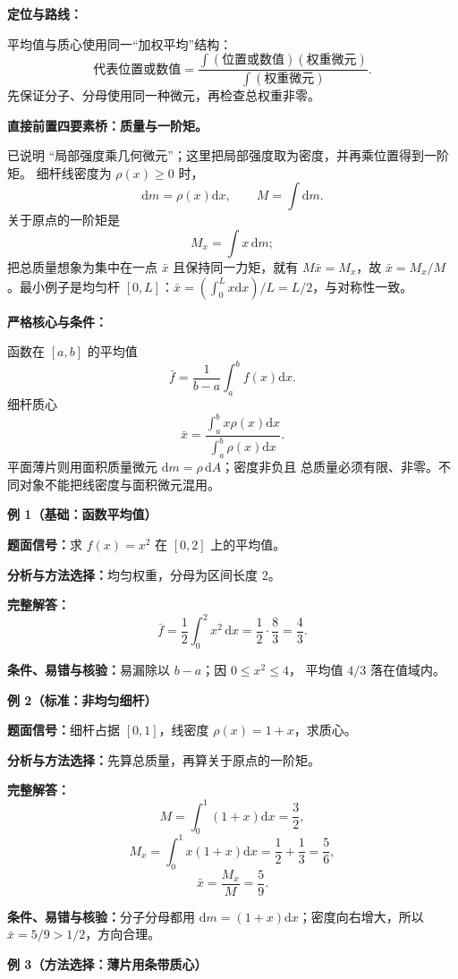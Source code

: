 \begin{knowledgeBox}
\textbf{定位与路线：}

平均值与质心使用同一“加权平均”结构：
\[
\boxed{\text{代表位置或数值}
=\frac{\int(\text{位置或数值})(\text{权重微元})}
{\int(\text{权重微元})}.}
\]
先保证分子、分母使用同一种微元，再检查总权重非零。

\textbf{直接前置四要素桥：质量与一阶矩。}

已说明
“局部强度乘几何微元”；这里把局部强度取为密度，并再乘位置得到一阶矩。
细杆线密度为 \(\rho(x)\ge0\) 时，
\[
\mathrm dm=\rho(x)\mathrm dx,\qquad
M=\int\mathrm dm.
\]
关于原点的一阶矩是
\[
M_x=\int x\,\mathrm dm;
\]
把总质量想象为集中在一点 \(\bar x\) 且保持同一力矩，就有
\(M\bar x=M_x\)，故 \(\bar x=M_x/M\)。最小例子是均匀杆
\([0,L]\)：\(\bar x=(\int_0^Lx\mathrm dx)/L=L/2\)，与对称性一致。

\textbf{严格核心与条件：}

函数在 \([a,b]\) 的平均值
\[
\bar f=\frac1{b-a}\int_a^bf(x)\mathrm dx.
\]
细杆质心
\[
\bar x=\frac{\int_a^bx\rho(x)\mathrm dx}
{\int_a^b\rho(x)\mathrm dx}.
\]
平面薄片则用面积质量微元 \(\mathrm dm=\rho\,\mathrm dA\)；密度非负且
总质量必须有限、非零。不同对象不能把线密度与面积微元混用。

\textbf{例 1（基础：函数平均值）}

\textbf{题面信号：}求 \(f(x)=x^2\) 在 \([0,2]\) 上的平均值。

\textbf{分析与方法选择：}均匀权重，分母为区间长度 \(2\)。

\textbf{完整解答：}
\[
\bar f=\frac12\int_0^2x^2\,\mathrm dx
=\frac12\cdot\frac83=\frac43.
\]

\textbf{条件、易错与核验：}易漏除以 \(b-a\)；因 \(0\le x^2\le4\)，
平均值 \(4/3\) 落在值域内。

\textbf{例 2（标准：非均匀细杆）}

\textbf{题面信号：}细杆占据 \([0,1]\)，线密度
\(\rho(x)=1+x\)，求质心。

\textbf{分析与方法选择：}先算总质量，再算关于原点的一阶矩。

\textbf{完整解答：}
\[
M=\int_0^1(1+x)\mathrm dx=\frac32,
\]
\[
M_x=\int_0^1x(1+x)\mathrm dx=\frac12+\frac13=\frac56,
\]
\[
\boxed{\bar x=\frac{M_x}{M}=\frac59.}
\]

\textbf{条件、易错与核验：}分子分母都用
\(\mathrm dm=(1+x)\mathrm dx\)；密度向右增大，所以
\(\bar x=5/9>1/2\)，方向合理。

\textbf{例 3（方法选择：薄片用条带质心）}


\end{knowledgeBox}
